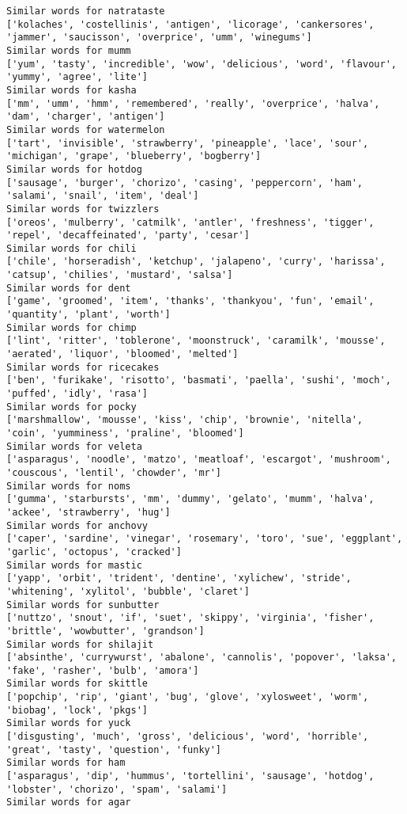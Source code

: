 \documentclass[11pt]{article}
\begin{document}
\begin{Verbatim}[commandchars=\\\{\}]
Similar words for natrataste
['kolaches', 'costellinis', 'antigen', 'licorage', 'cankersores', 'jammer', 'saucisson', 'overprice', 'umm', 'winegums']
Similar words for mumm
['yum', 'tasty', 'incredible', 'wow', 'delicious', 'word', 'flavour', 'yummy', 'agree', 'lite']
Similar words for kasha
['mm', 'umm', 'hmm', 'remembered', 'really', 'overprice', 'halva', 'dam', 'charger', 'antigen']
Similar words for watermelon
['tart', 'invisible', 'strawberry', 'pineapple', 'lace', 'sour', 'michigan', 'grape', 'blueberry', 'bogberry']
Similar words for hotdog
['sausage', 'burger', 'chorizo', 'casing', 'peppercorn', 'ham', 'salami', 'snail', 'item', 'deal']
Similar words for twizzlers
['oreos', 'mulberry', 'catmilk', 'antler', 'freshness', 'tigger', 'repel', 'decaffeinated', 'party', 'cesar']
Similar words for chili
['chile', 'horseradish', 'ketchup', 'jalapeno', 'curry', 'harissa', 'catsup', 'chilies', 'mustard', 'salsa']
Similar words for dent
['game', 'groomed', 'item', 'thanks', 'thankyou', 'fun', 'email', 'quantity', 'plant', 'worth']
Similar words for chimp
['lint', 'ritter', 'toblerone', 'moonstruck', 'caramilk', 'mousse', 'aerated', 'liquor', 'bloomed', 'melted']
Similar words for ricecakes
['ben', 'furikake', 'risotto', 'basmati', 'paella', 'sushi', 'moch', 'puffed', 'idly', 'rasa']
Similar words for pocky
['marshmallow', 'mousse', 'kiss', 'chip', 'brownie', 'nitella', 'coin', 'yumminess', 'praline', 'bloomed']
Similar words for veleta
['asparagus', 'noodle', 'matzo', 'meatloaf', 'escargot', 'mushroom', 'couscous', 'lentil', 'chowder', 'mr']
Similar words for noms
['gumma', 'starbursts', 'mm', 'dummy', 'gelato', 'mumm', 'halva', 'ackee', 'strawberry', 'hug']
Similar words for anchovy
['caper', 'sardine', 'vinegar', 'rosemary', 'toro', 'sue', 'eggplant', 'garlic', 'octopus', 'cracked']
Similar words for mastic
['yapp', 'orbit', 'trident', 'dentine', 'xylichew', 'stride', 'whitening', 'xylitol', 'bubble', 'claret']
Similar words for sunbutter
['nuttzo', 'snout', 'if', 'suet', 'skippy', 'virginia', 'fisher', 'brittle', 'wowbutter', 'grandson']
Similar words for shilajit
['absinthe', 'currywurst', 'abalone', 'cannolis', 'popover', 'laksa', 'fake', 'rasher', 'bulb', 'amora']
Similar words for skittle
['popchip', 'rip', 'giant', 'bug', 'glove', 'xylosweet', 'worm', 'biobag', 'lock', 'pkgs']
Similar words for yuck
['disgusting', 'much', 'gross', 'delicious', 'word', 'horrible', 'great', 'tasty', 'question', 'funky']
Similar words for ham
['asparagus', 'dip', 'hummus', 'tortellini', 'sausage', 'hotdog', 'lobster', 'chorizo', 'spam', 'salami']
Similar words for agar

\end{Verbatim}
\end{document}
